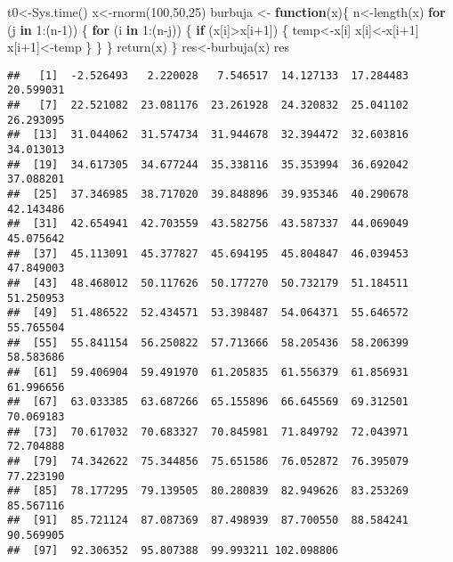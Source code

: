 \documentclass[]{elsarticle} %
\newenvironment{Shaded}{\begin{snugshade}}{\end{snugshade}}
\newcommand{\ControlFlowTok}[1]{\textcolor[rgb]{0.13,0.29,0.53}{\textbf{#1}}}
\newcommand{\DecValTok}[1]{\textcolor[rgb]{0.00,0.00,0.81}{#1}}
\newcommand{\FunctionTok}[1]{\textcolor[rgb]{0.00,0.00,0.00}{#1}}
\newcommand{\NormalTok}[1]{#1}
\newcommand{\OtherTok}[1]{\textcolor[rgb]{0.56,0.35,0.01}{#1}}
\newcommand{\SpecialCharTok}[1]{\textcolor[rgb]{0.00,0.00,0.00}{#1}}
\begin{document}
\begin{Shaded}
\begin{Highlighting}[]
\NormalTok{t0}\OtherTok{\textless{}{-}}\FunctionTok{Sys.time}\NormalTok{()}
\NormalTok{x}\OtherTok{\textless{}{-}}\FunctionTok{rnorm}\NormalTok{(}\DecValTok{100}\NormalTok{,}\DecValTok{50}\NormalTok{,}\DecValTok{25}\NormalTok{)}
\NormalTok{burbuja }\OtherTok{\textless{}{-}} \ControlFlowTok{function}\NormalTok{(x)\{}
\NormalTok{  n}\OtherTok{\textless{}{-}}\FunctionTok{length}\NormalTok{(x)}
  \ControlFlowTok{for}\NormalTok{ (j }\ControlFlowTok{in} \DecValTok{1}\SpecialCharTok{:}\NormalTok{(n}\DecValTok{{-}1}\NormalTok{)) \{}
    \ControlFlowTok{for}\NormalTok{ (i }\ControlFlowTok{in} \DecValTok{1}\SpecialCharTok{:}\NormalTok{(n}\SpecialCharTok{{-}}\NormalTok{j)) \{}
      \ControlFlowTok{if}\NormalTok{ (x[i]}\SpecialCharTok{\textgreater{}}\NormalTok{x[i}\SpecialCharTok{+}\DecValTok{1}\NormalTok{]) \{}
\NormalTok{        temp}\OtherTok{\textless{}{-}}\NormalTok{x[i]}
\NormalTok{        x[i]}\OtherTok{\textless{}{-}}\NormalTok{x[i}\SpecialCharTok{+}\DecValTok{1}\NormalTok{]}
\NormalTok{        x[i}\SpecialCharTok{+}\DecValTok{1}\NormalTok{]}\OtherTok{\textless{}{-}}\NormalTok{temp}
\NormalTok{      \}}
\NormalTok{    \}}
\NormalTok{  \}}
  \FunctionTok{return}\NormalTok{(x)}
\NormalTok{\}}
\NormalTok{res}\OtherTok{\textless{}{-}}\FunctionTok{burbuja}\NormalTok{(x)}
\NormalTok{res}
\end{Highlighting}
\end{Shaded}

\begin{verbatim}
##   [1]  -2.526493   2.220028   7.546517  14.127133  17.284483  20.599031
##   [7]  22.521082  23.081176  23.261928  24.320832  25.041102  26.293095
##  [13]  31.044062  31.574734  31.944678  32.394472  32.603816  34.013013
##  [19]  34.617305  34.677244  35.338116  35.353994  36.692042  37.088201
##  [25]  37.346985  38.717020  39.848896  39.935346  40.290678  42.143486
##  [31]  42.654941  42.703559  43.582756  43.587337  44.069049  45.075642
##  [37]  45.113091  45.377827  45.694195  45.804847  46.039453  47.849003
##  [43]  48.468012  50.117626  50.177270  50.732179  51.184511  51.250953
##  [49]  51.486522  52.434571  53.398487  54.064371  55.646572  55.765504
##  [55]  55.841154  56.250822  57.713666  58.205436  58.206399  58.583686
##  [61]  59.406904  59.491970  61.205835  61.556379  61.856931  61.996656
##  [67]  63.033385  63.687266  65.155896  66.645569  69.312501  70.069183
##  [73]  70.617032  70.683327  70.845981  71.849792  72.043971  72.704888
##  [79]  74.342622  75.344856  75.651586  76.052872  76.395079  77.223190
##  [85]  78.177295  79.139505  80.280839  82.949626  83.253269  85.567116
##  [91]  85.721124  87.087369  87.498939  87.700550  88.584241  90.569905
##  [97]  92.306352  95.807388  99.993211 102.098806
\end{verbatim}
\end{document}
